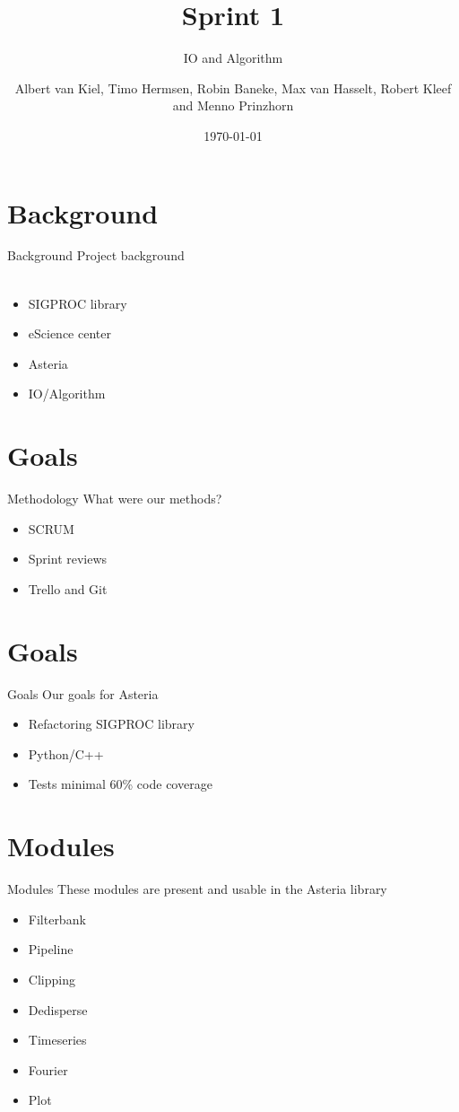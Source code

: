 \documentclass{beamer}
\title{Sprint 1}
\subtitle{IO and Algorithm}
\author{Albert van Kiel, Timo Hermsen, Robin Baneke, Max van Hasselt, Robert Kleef and Menno Prinzhorn}
\date{\today}
\begin{document}
\begin{frame}
    \titlepage
\end{frame}

\section{Background}
    
\begin{frame}{Background}
    Project background
    \\~\\
    \begin{itemize}
        \item SIGPROC library
        \item eScience center
        \item Asteria
        \item IO/Algorithm
    \end{itemize}
\end{frame}

\section{Goals}
	\begin{frame}{Methodology}
	What were our methods?     
	\begin{itemize}
		\item SCRUM
		\item Sprint reviews
		\item Trello and Git
	\end{itemize}
\end{frame}

\section{Goals}
\begin{frame}{Goals}
    Our goals for Asteria      
    \begin{itemize}
        \item Refactoring SIGPROC library
        \item Python/C++
        \item Tests minimal 60\% code coverage
    \end{itemize}
\end{frame}

\section{Modules}
\begin{frame}{Modules}
	These modules are present and usable in the Asteria library     
	\begin{itemize}
		\item Filterbank
		\item Pipeline
		\item Clipping
		\item Dedisperse
		\item Timeseries
		\item Fourier
		\item Plot
	\end{itemize}
\end{frame}
\end{document}
